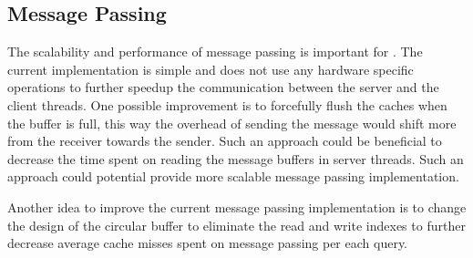 \subsection{Message Passing}

The scalability and performance of message passing is important for \cphash{}. The current implementation is simple and does not use
any hardware specific operations to further speedup the communication between the server and the client threads. One possible improvement is to
forcefully flush the caches when the buffer is full, this way the overhead of sending the message would shift more from the receiver towards the sender. 
Such an approach could be beneficial to decrease the time spent on reading the message buffers in server threads. Such an approach could potential provide
more scalable message passing implementation. 

Another idea to improve the current message passing implementation is to change the design of the circular buffer to eliminate the read and write indexes
to further decrease average cache misses spent on message passing per each query. 

